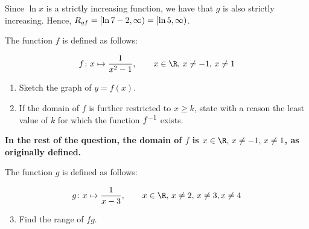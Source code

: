 \documentclass{echw}
\begin{document}
            Since $\ln x$ is a strictly increasing function, we have that $g$ is also strictly increasing. Hence, $R_{gf} = [\ln{7 - 2}, \infty) = [\ln 5, \infty)$.
            
            \boxt{$\ran{gf} = [\ln 5, \infty)$}

    \problem{}
        The function $f$ is defined as follows:

        \begin{equation*}
            f \colon x \mapsto \dfrac1{x^2 - 1}, \qquad x \in \R, \, x \neq -1, \, x \neq 1
        \end{equation*}

        \begin{enumerate}
            \item Sketch the graph of $y = f(x)$.
            \item If the domain of $f$ is further restricted to $x \geq k$, state with a reason the least value of $k$ for which the function $f^{-1}$ exists.
        \end{enumerate}

         \textbf{In the rest of the question, the domain of $f$ is $x \in \R, \, x \neq -1, \, x \neq 1$, as originally defined.}

        \smallskip

         The function $g$ is defined as follows:

        \begin{equation*}
            g \colon x \mapsto \dfrac1{x-3}, \qquad x \in \R, \, x \neq 2, \, x \neq 3, x \neq 4
        \end{equation*}

        \begin{enumerate}
            \setcounter{enumi}{2}
            \item Find the range of $fg$.
        \end{enumerate}
    
    \solution
\end{document}
